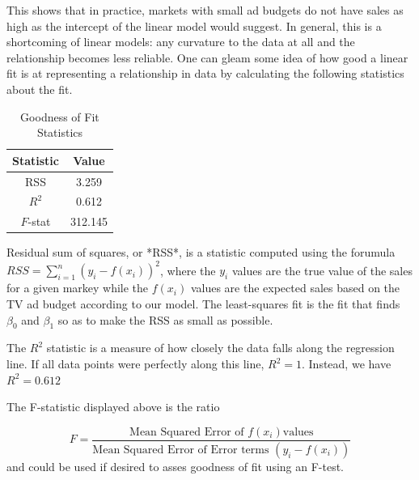 \documentclass{article}
\begin{document}
This shows that in practice, markets with small ad budgets do not have sales as high as the intercept of the linear model would suggest.  In general, this is a shortcoming of linear models:  any curvature to the data at all and the relationship becomes less reliable.  One can gleam some idea of how good a linear fit is at representing a relationship in data by calculating the following statistics about the fit.

\begin{table}[ht]
\centering
\begin{tabular}{|c|c|}
Statistic & Value \\ \hline
RSS & 3.259 \\
$R^2$ & 0.612 \\
$F$-stat & 312.145 \\
\end{tabular}
\caption{Goodness of Fit Statistics}
\end{table}

Residual sum of squares, or *RSS*, is a statistic computed using the forumula $RSS = \sum_{i=1}^n (y_i - f(x_i))^2$, where the $y_i$ values are the true value of the sales for a given markey while the $f(x_i)$ values are the expected sales based on the TV ad budget according to our model.  The least-squares fit is the fit that finds $\beta_0$ and $\beta_1$ so as to make the RSS as small as possible. 

The $R^2$ statistic is a measure of how closely the data falls along the regression line.  If all data points were perfectly along this line, $R^2 = 1$.  Instead, we have $R^2 = 0.612$

The F-statistic displayed above is the ratio 

\begin{equation}
F = \frac{\mbox{Mean Squared Error of }f(x_i) \mbox{values}}
               {\mbox{Mean Squared Error of Error terms }{(y_i - f(x_i))}}
\end{equation}
and could be used if desired to asses goodness of fit using an F-test.
\end{document}
